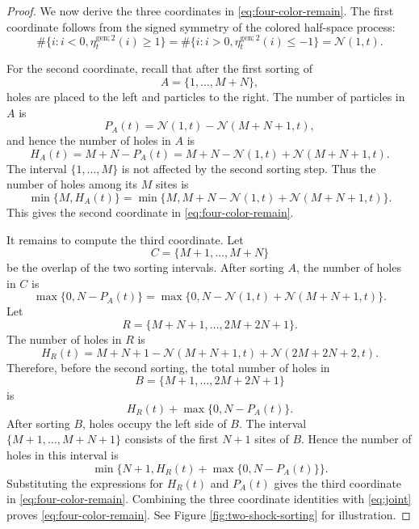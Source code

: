 \documentclass[12pt,a4paper]{amsart}
\theoremstyle{remark}
\numberwithin{equation}{section} \numberwithin{theorem}{section}
\begin{document}
\begin{proof}
We now derive the three coordinates in \eqref{eq:four-color-remain}. 
The first coordinate follows from the signed symmetry of the colored half-space process:
\[
\#\{i:i<0,\eta_t^{\mathrm{gen};2}(i)\geq1\}
=
\#\{i:i>0,\eta_t^{\mathrm{gen};2}(i)\leq -1\}
=
\mathcal N(1,t).
\]

For the second coordinate, recall that after the first sorting of
\[
A=\{1,\ldots,M+N\},
\]
holes are placed to the left and particles to the right. 
The number of particles in $A$ is
\[
P_A(t)=\mathcal N(1,t)-\mathcal N(M+N+1,t),
\]
and hence the number of holes in $A$ is
\[
H_A(t)=M+N-P_A(t)
=
M+N-\mathcal N(1,t)+\mathcal N(M+N+1,t).
\]
The interval $\{1,\ldots,M\}$ is not affected by the second sorting step. 
Thus the number of holes among its $M$ sites is
\[
\min\{M,H_A(t)\}
=
\min\{M,M+N-\mathcal N(1,t)+\mathcal N(M+N+1,t)\}.
\]
This gives the second coordinate in \eqref{eq:four-color-remain}.

It remains to compute the third coordinate. 
Let
\[
C=\{M+1,\ldots,M+N\}
\]
be the overlap of the two sorting intervals. 
After sorting $A$, the number of holes in $C$ is
\[
\max\{0,N-P_A(t)\}
=
\max\{0,N-\mathcal N(1,t)+\mathcal N(M+N+1,t)\}.
\]
Let
\[
R=\{M+N+1,\ldots,2M+2N+1\}.
\]
The number of holes in $R$ is
\[
H_R(t)
=
M+N+1-\mathcal N(M+N+1,t)+\mathcal N(2M+2N+2,t).
\]
Therefore, before the second sorting, the total number of holes in
\[
B=\{M+1,\ldots,2M+2N+1\}
\]
is
\[
H_R(t)+\max\{0,N-P_A(t)\}.
\]
After sorting $B$, holes occupy the left side of $B$. 
The interval $\{M+1,\ldots,M+N+1\}$ consists of the first $N+1$ sites of $B$. 
Hence the number of holes in this interval is
\[
\min\bigl\{N+1,
H_R(t)+\max\{0,N-P_A(t)\}
\bigr\}.
\]
Substituting the expressions for $H_R(t)$ and $P_A(t)$ gives the third coordinate in \eqref{eq:four-color-remain}. 
Combining the three coordinate identities with \eqref{eq:joint} proves \eqref{eq:four-color-remain}. See Figure \ref{fig:two-shock-sorting} for illustration.
\end{proof}
\end{document}
